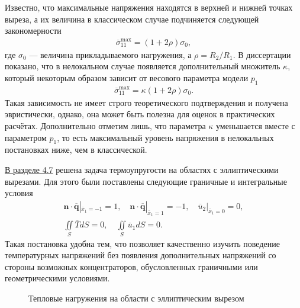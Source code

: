 Известно, что максимальные напряжения находятся в верхней и нижней точках выреза, а их величина в классическом случае подчиняется следующей закономерности
\begin{gather*}
	\overline{\sigma}_{11}^{\max} = \left( 1 + 2 \rho \right) \sigma_0,
\end{gather*}
где $\sigma_0$ --- величина прикладываемого нагружения, а $\rho = R_2 / R_1$. В диссертации показано, что в нелокальном случае появляется дополнительный множитель $\kappa$, который некоторым образом зависит от весового параметра модели $p_1$
 \begin{gather*}
	\overline{\sigma}_{11}^{\max} = \kappa \left( 1 + 2 \rho \right) \sigma_0.
\end{gather*}
Такая зависимость не имеет строго теоретического подтверждения и получена эвристически, однако, она может быть полезна для оценок в практических расчётах. Дополнительно отметим лишь, что параметра $\kappa$ уменьшается вместе с параметром $p_1$, то есть максимальный уровень напряжения в нелокальных постановках ниже, чем в классической.

\underline{В разделе 4.7} решена задача термоупругости на областях с эллиптическими вырезами. Для этого были поставлены следующие граничные и интегральные условия
\begin{gather*}
	\boldsymbol{n} \cdot \overline{\boldsymbol{q}}|_{\overline{x}_1 = -1} = 1,
	\quad
	\boldsymbol{n} \cdot \overline{\boldsymbol{q}}|_{\overline{x}_1 = 1} = -1,
	\quad
	\overline{u}_2 |_{\overline{x}_1 = 0} = 0,
	\\
	\iint\limits_S \overline{T} dS = 0,
	\quad
	\iint\limits_S \overline{u}_1 dS = 0.
\end{gather*}
Такая постановка удобна тем, что позволяет качественно изучить поведение температурных напряжений без появления дополнительных напряжений со стороны возможных концентраторов, обусловленных граничными или геометрическими условиями.

\begin{figure}[ht]
    \caption{Тепловые нагружения на области с эллиптическим вырезом}
    \label{fig:ThermalKirshProblem}
\end{figure}

